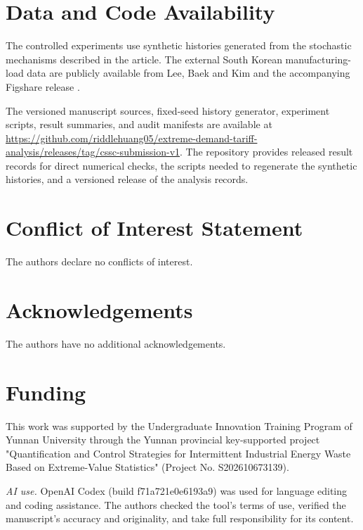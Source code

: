 \documentclass[suppldata]{interact}
\begin{document}
\section*{Data and Code Availability}
The controlled experiments use synthetic histories generated from the
stochastic mechanisms described in the article. The external
South Korean manufacturing-load data are publicly available from Lee,
Baek and Kim \citep{Lee2022KoreanFactories} and the accompanying
Figshare release \citep{LeeFigshareV9}.

The versioned manuscript sources, fixed-seed history generator, experiment
scripts, result summaries, and audit manifests are available at\newline
\url{https://github.com/riddlehuang05/extreme-demand-tariff-analysis/releases/tag/cssc-submission-v1}.
The repository provides released result records for direct numerical
checks, the scripts needed to regenerate the synthetic histories, and a
versioned release of the analysis records.

\section*{Conflict of Interest Statement}
The authors declare no conflicts of interest.

\section*{Acknowledgements}
The authors have no additional acknowledgements.

\section*{Funding}
This work was supported by the Undergraduate Innovation Training Program of Yunnan University through the Yunnan provincial key-supported project "Quantification and Control Strategies for Intermittent Industrial Energy Waste Based on Extreme-Value Statistics" (Project No. S202610673139).

\noindent\textit{AI use.} OpenAI Codex (build f71a721e0e6193a9) was used for language editing and coding assistance. The authors checked the tool's terms of use, verified the manuscript's accuracy and originality, and take full responsibility for its content.

\renewcommand{\bibfont}{\normalfont\fontsize{12}{16}\selectfont}


\end{document}
